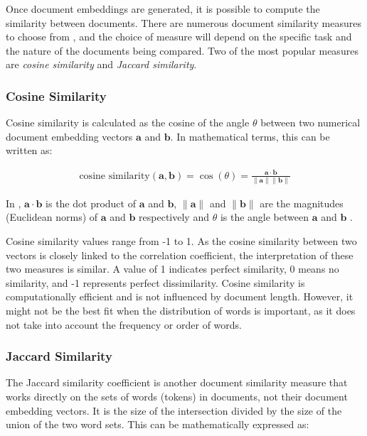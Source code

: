 Once document embeddings are generated, it is possible to compute the similarity between documents.
There are numerous document similarity measures to choose from \cite{BriggsSemanticSearch2020}, and the choice of measure will depend on the specific task and the nature of the documents being compared. Two of the most popular measures are \emph{cosine similarity} and \emph{Jaccard similarity}.

\subsubsection*{Cosine Similarity}

Cosine similarity is calculated as the cosine of the angle $\theta$ between
two numerical document embedding vectors $\mathbf{a}$ and $\mathbf{b}$. In mathematical terms, this can be written as:

\begin{align}
    \text{cosine similarity} (\mathbf{a}, \mathbf{b})
    = \cos(\theta)
    = \frac{\mathbf{a} \cdot \mathbf{b}}{\|\mathbf{a}\|\|\mathbf{b}\|} \label{eq:cosine-similarity}
\end{align}

In , $\mathbf{a} \cdot \mathbf{b}$ is the dot product of $\mathbf{a}$ and $\mathbf{b}$, $\|\mathbf{a}\|$ and $\|\mathbf{b}\|$ are the magnitudes (Euclidean norms) of $\mathbf{a}$ and $\mathbf{b}$ respectively and $\theta$ is the angle between $\mathbf{a}$ and $\mathbf{b}$ \cite{SinghalModernInformation2001}.

Cosine similarity values range from -1 to 1.
As the cosine similarity between two vectors is closely linked to the correlation coefficient, the interpretation of these two measures is similar.
A value of 1 indicates perfect similarity, 0 means no similarity, and -1 represents perfect dissimilarity.
Cosine similarity is computationally efficient and is not influenced by document length. However, it might not be the best fit when the distribution of words is important, as it does not take into account the frequency or order of words.

\subsubsection*{Jaccard Similarity}

The Jaccard similarity coefficient \cite{JaccardEtudeDistribution1901} is another document similarity measure that works directly on the sets of words (tokens) in documents, not their document embedding vectors. It is the size of the intersection divided by the size of the union of the two word sets. This can be mathematically expressed as:

